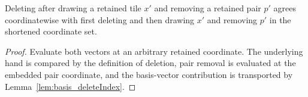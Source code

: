 \begin{lemma}

  \label{lem:deleteThree_removePair_add_basis}
  Deleting after drawing a retained tile \(x'\) and removing a retained
  pair \(p'\) agrees coordinatewise with first deleting and then drawing
  \(x'\) and removing \(p'\) in the shortened coordinate set.
\end{lemma}
\begin{proof}

\leanok
  Evaluate both vectors at an arbitrary retained coordinate.  The
  underlying hand is compared by the definition of deletion, pair removal
  is evaluated at the embedded pair coordinate, and the basis-vector
  contribution is transported by Lemma~\ref{lem:basis_deleteIndex}.
\end{proof}

